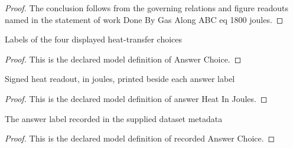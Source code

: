 \begin{proof}
  The conclusion follows from the governing relations and figure readouts named in the statement of work Done By Gas Along ABC eq 1800 joules.
\end{proof}
\begin{definition}
  \label{def:physics:phyx-mini-0344:phyxminiproblems-problemphyxmini0344-answerchoice}
  Labels of the four displayed heat-transfer choices
\end{definition}
\begin{proof}
  This is the declared model definition of Answer Choice.
\end{proof}
\begin{definition}
  \label{def:physics:phyx-mini-0344:phyxminiproblems-problemphyxmini0344-answerheatinjoules}
  Signed heat readout, in joules, printed beside each answer label
\end{definition}
\begin{proof}
  This is the declared model definition of answer Heat In Joules.
\end{proof}
\begin{definition}
  \label{def:physics:phyx-mini-0344:phyxminiproblems-problemphyxmini0344-recordedanswerchoice}
  The answer label recorded in the supplied dataset metadata
\end{definition}
\begin{proof}
  This is the declared model definition of recorded Answer Choice.
\end{proof}
